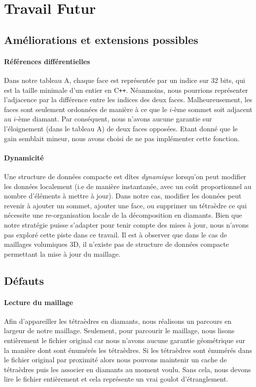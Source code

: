 \section{Travail Futur}
\subsection{Améliorations et extensions possibles}
\paragraph{Références différentielles}
Dans notre tableau A, chaque face est représentée par un indice sur 32 bits, qui est la taille minimale d'un entier en C\texttt{++}. Néanmoins, nous pourrions représenter l'adjacence par la différence entre les indices des deux faces. Malheureusement, les faces sont seulement ordonnées de manière à ce que le $i$-ème sommet soit adjacent au $i$-ème diamant. Par conséquent, nous n'avons aucune garantie sur l'éloignement (dans le tableau A) de deux faces opposées. Etant donné que le gain semblait mineur, nous avons choisi de ne pas implémenter cette fonction.
\paragraph{Dynamicité}
Une structure de données compacte est dîtes \textit{dynamique} lorsqu'on peut modifier les données localement (i.e de manière instantanée, avec un coût proportionnel au nombre d'éléments à mettre à jour). Dans notre cas, modifier les données peut revenir à ajouter un sommet, ajouter une face, ou supprimer un tétraèdre ce qui nécessite une re-organisation locale de la décomposition en diamants. Bien que notre stratégie puisse s'adapter pour tenir compte des mises à jour, nous n'avons pas exploré cette piste dans ce travail. Il est à observer que dans le cas de maillages volumiques 3D, il n'existe pas de structure de données compacte permettant la mise à jour du maillage.

\subsection{Défauts}
\label{defauts}
\noindent
\paragraph{Lecture du maillage}Afin d'appareiller les tétraèdres en diamants, nous réalisons un parcours en largeur de notre maillage. Seulement, pour parcourir le maillage, nous lisons entièrement le fichier original car nous n'avons aucune garantie géométrique sur la manière dont sont énumérés les tétraèdres. Si les tétraèdres sont énumérés dans le fichier original par proximité alors nous pouvons maintenir un cache de tétraèdres puis les associer en diamants au moment voulu. Sans cela, nous devons lire le fichier entièrement et cela représente un vrai goulot d'étranglement.
